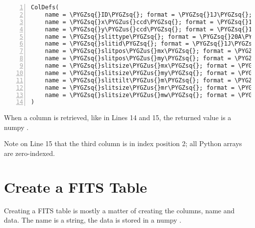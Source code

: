 \documentclass[letterpaper,10pt,english]{sphinxmanual}
\def\PYGZus{\char`\_}
\def\PYGZhy{\char`\-}
\def\PYGZsq{\char`\'}
\begin{document}
\begin{Verbatim}[commandchars=\\\{\},numbers=left,firstnumber=1,stepnumber=1]
ColDefs(
    name = \PYGZsq{}ID\PYGZsq{}; format = \PYGZsq{}1J\PYGZsq{}; null = \PYGZhy{}2147483647; disp = \PYGZsq{}A3\PYGZsq{}
    name = \PYGZsq{}x\PYGZus{}ccd\PYGZsq{}; format = \PYGZsq{}1E\PYGZsq{}; disp = \PYGZsq{}F8.2\PYGZsq{}
    name = \PYGZsq{}y\PYGZus{}ccd\PYGZsq{}; format = \PYGZsq{}1E\PYGZsq{}; disp = \PYGZsq{}F8.2\PYGZsq{}
    name = \PYGZsq{}slittype\PYGZsq{}; format = \PYGZsq{}20A\PYGZsq{}; disp = \PYGZsq{}A10\PYGZsq{}
    name = \PYGZsq{}slitid\PYGZsq{}; format = \PYGZsq{}1J\PYGZsq{}; null = \PYGZhy{}2147483647; disp = \PYGZsq{}A3\PYGZsq{}
    name = \PYGZsq{}slitpos\PYGZus{}mx\PYGZsq{}; format = \PYGZsq{}1E\PYGZsq{}; disp = \PYGZsq{}F8.2\PYGZsq{}
    name = \PYGZsq{}slitpos\PYGZus{}my\PYGZsq{}; format = \PYGZsq{}1E\PYGZsq{}; disp = \PYGZsq{}F8.2\PYGZsq{}
    name = \PYGZsq{}slitsize\PYGZus{}mx\PYGZsq{}; format = \PYGZsq{}1E\PYGZsq{}; disp = \PYGZsq{}F8.2\PYGZsq{}
    name = \PYGZsq{}slitsize\PYGZus{}my\PYGZsq{}; format = \PYGZsq{}1E\PYGZsq{}; disp = \PYGZsq{}F8.2\PYGZsq{}
    name = \PYGZsq{}slittilt\PYGZus{}m\PYGZsq{}; format = \PYGZsq{}1E\PYGZsq{}; disp = \PYGZsq{}F8.2\PYGZsq{}
    name = \PYGZsq{}slitsize\PYGZus{}mr\PYGZsq{}; format = \PYGZsq{}1E\PYGZsq{}; disp = \PYGZsq{}F6.2\PYGZsq{}
    name = \PYGZsq{}slitsize\PYGZus{}mw\PYGZsq{}; format = \PYGZsq{}1E\PYGZsq{}; disp = \PYGZsq{}F6.2\PYGZsq{}
)
\end{Verbatim}

When a column is retrieved, like in Lines 14 and 15, the returned value is
a numpy .

Note on Line 15 that the third column is in index position 2; all Python
arrays are zero-indexed.


\section{Create a FITS Table}
\label{tables:create-a-fits-table}
Creating a FITS table is mostly a matter of creating the columns, name and
data.  The name is a string, the data is stored in a numpy .
\end{document}
